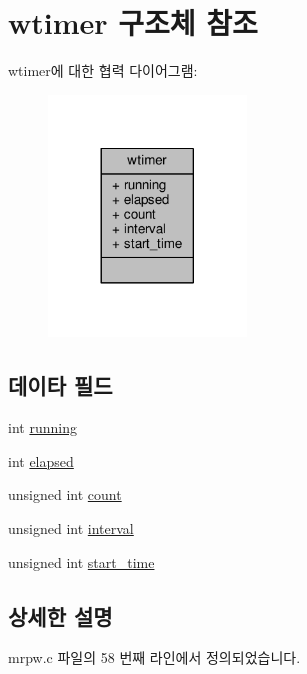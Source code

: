 \hypertarget{structwtimer}{}\section{wtimer 구조체 참조}
\label{structwtimer}


wtimer에 대한 협력 다이어그램\+:
\nopagebreak
\begin{figure}[H]
\begin{center}
\leavevmode
\includegraphics[width=149pt]{structwtimer__coll__graph}
\end{center}
\end{figure}
\subsection*{데이타 필드}
\begin{DoxyCompactItemize}
\item 
int \hyperlink{structwtimer_a2f45113638a0b749a8a205d2cd7fb42b}{running}
\item 
int \hyperlink{structwtimer_a4bd3978f9fa83a0e08225dca54a00eb6}{elapsed}
\item 
unsigned int \hyperlink{structwtimer_a16ff2d8e15ade4948398b0aeb80124a8}{count}
\item 
unsigned int \hyperlink{structwtimer_a23545cd41cdc93998f5b3caeb3e29936}{interval}
\item 
unsigned int \hyperlink{structwtimer_a84903b4395021e776bfb0b9f303b0142}{start\+\_\+time}
\end{DoxyCompactItemize}


\subsection{상세한 설명}


mrpw.\+c 파일의 58 번째 라인에서 정의되었습니다.



